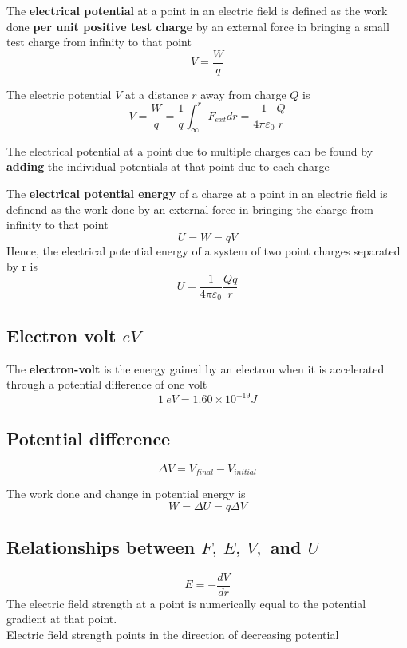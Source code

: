 \documentclass[a4paper, 10pt]{article}
\begin{document}
\begin{framed}
   The \textbf{electrical potential} at a point in an electric field is defined as the work done \textbf{per unit positive test charge} by an external force in bringing a small test charge from infinity to that point
   \[
   V = \frac{W}{q}
   \]

   The electric potential $V$  at a distance $r$ away from charge $Q$ is 
   \[
      V = \frac{W}{q} = \frac{1}{q} \int_{\infty}^{r} F_{ext}dr = \frac{1}{4\pi\varepsilon_0} \frac{Q}{r}
   \]

   The electrical potential at a point due to multiple charges can be found by \textbf{adding} the individual potentials at that point due to each charge
\end{framed}	

\begin{framed}
   The \textbf{electrical potential energy} of a charge at a point in an electric field is definend as the work done by an external force in bringing the charge from infinity to that point
   \[
   U = W = qV
   \]
   Hence, the electrical potential energy of a system of two point charges separated by r is
   \[
      U = \frac{1}{4\pi\varepsilon_0} \frac{Qq}{r}
   \]
\end{framed}	

\subsection{Electron volt $eV$ }
\begin{framed}
   The \textbf{electron-volt} is the energy gained by an electron when it is accelerated through a potential difference of one volt
   \[
      1\ eV = 1.60 \times 10^{-19} J
   \]
   
\end{framed}	

\subsection{Potential difference}
\[
   \Delta V = V_{final} - V_{initial}
\]

The work done and change in potential energy is 
\[
 W = \Delta U = q \Delta V
\]

\subsection{Relationships between $F,\ E,\ V,$ and $U$}
\begin{framed}
   \[
   E = - \frac{dV}{dr}
   \]
   The electric field strength at a point is numerically equal to the potential gradient at that point. \\

   Electric field strength points in the direction of decreasing potential
\end{framed}	
\end{document}
